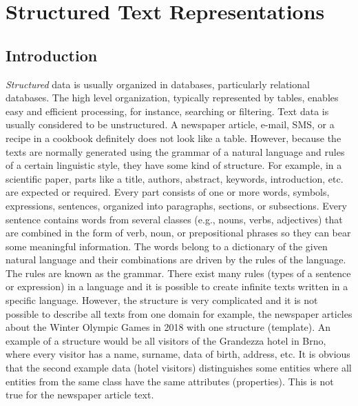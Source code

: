 \chapter{Structured Text Representations}

\section{Introduction}

\textit{Structured} data is usually organized in databases, particularly relational
databases. The high level organization, typically represented by tables, enables
easy and efficient processing, for instance, searching or filtering. Text data is
usually considered to be unstructured. A newspaper article, e-mail, SMS, or a
recipe in a cookbook definitely does not look like a table. However, because the
texts are normally generated using the grammar of a natural language and rules
of a certain linguistic style, they have some kind of structure. For example, in a
scientific paper, parts like a title, authors, abstract, keywords, introduction, etc.
are expected or required. Every part consists of one or more words, symbols,
expressions, sentences, organized into paragraphs, sections, or subsections. Every sentence contains words from several classes (e.g., nouns, verbs, adjectives)
that are combined in the form of verb, noun, or prepositional phrases so they
can bear some meaningful information. The words belong to a dictionary of the
given natural language and their combinations are driven by the rules of the language. The rules are known as the grammar. There exist many rules (types of
a sentence or expression) in a language and it is possible to create infinite texts
written in a specific language. However, the structure is very complicated and it
is not possible to describe all texts from one domain for example, the newspaper
articles about the Winter Olympic Games in 2018 with one structure (template).
An example of a structure would be all visitors of the Grandezza hotel in Brno,
where every visitor has a name, surname, data of birth, address, etc. It is obvious that the second example data (hotel visitors) distinguishes some entities where
all entities from the same class have the same attributes (properties). This is not
true for the newspaper article text.

